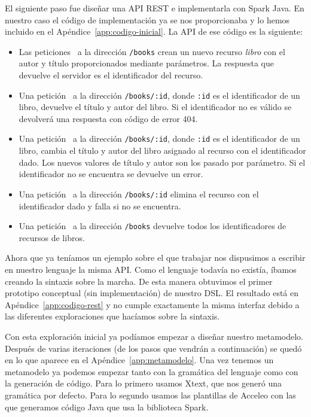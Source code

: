 \documentclass[runningheads]{llncs}
\begin{document}
El siguiente paso fue diseñar una API REST e implementarla con
Spark Java. En nuestro caso el código de implementación
ya se nos proporcionaba y lo hemos incluido en el
Apéndice~\ref{app:codigo-inicial}. La API de ese código es la siguiente:

\begin{itemize}
    \item Las peticiones \POST\ a la dirección
        \texttt{/books} crean un nuevo recurso \emph{libro} con el autor
        y título proporcionados mediante parámetros. La respuesta
        que devuelve el servidor es el identificador del recurso.
    \item Una petición \GET\ a la dirección \texttt{/books/:id}, donde
        \texttt{:id} es el identificador de un libro, devuelve el título
        y autor del libro. Si el identificador no es válido se devolverá
        una respuesta con código de error 404.
    \item Una petición \PUT\ a la dirección \texttt{/books/:id}, donde
        \texttt{:id} es el identificador de un libro, cambia el título
        y autor del libro asignado al recurso con el identificador dado. Los
        nuevos valores de título y autor son los pasado por parámetro. Si
        el identificador no se encuentra se devuelve un error.
    \item Una petición \DELETE\ a la dirección \texttt{/books/:id}
        elimina el recurso con el identificador dado y falla si no
        se encuentra.
    \item Una petición \GET\ a la dirección \texttt{/books} devuelve todos
        los identificadores de recursos de libros.
\end{itemize}

Ahora que ya teníamos un ejemplo sobre el que trabajar nos dispusimos
a escribir en nuestro lenguaje la misma API. Como el lenguaje todavía
no existía, íbamos creando la sintaxis sobre la marcha. De esta manera
obtuvimos el primer prototipo conceptual (sin implementación) de nuestro
DSL. El resultado está en Apéndice~\ref{app:codigo-rest} y no cumple
exactamente la misma interfaz debido a las diferentes exploraciones que
hacíamos sobre la sintaxis.


Con esta exploración inicial ya podíamos empezar a diseñar
nuestro metamodelo.  Después de varias iteraciones (de los pasos
que vendrán a continuación) se quedó en lo que aparece en el
Apéndice~\ref{app:metamodelo}. Una vez tenemos un metamodelo ya podemos
empezar tanto con la gramática del lenguaje como con la generación de
código. Para lo primero usamos Xtext, que nos generó una gramática
por defecto. Para lo segundo usamos las plantillas de Acceleo con las
que generamos código Java que usa la biblioteca Spark.
\end{document}
